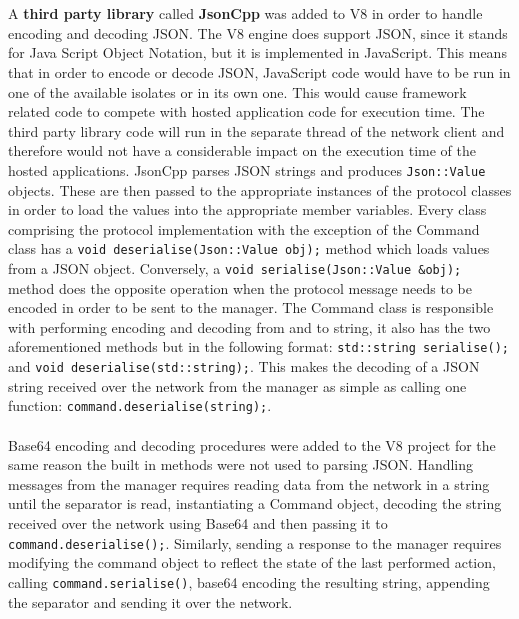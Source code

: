 \documentclass{l4proj}
\begin{document}
\\\\
\hspace*{1em} A \textbf{third party library} called \textbf{JsonCpp} was added to V8 in order to handle encoding and decoding JSON. The V8 engine does support JSON, since it stands for Java Script Object Notation, but it is implemented in JavaScript. This means that in order to encode or decode JSON, JavaScript code would have to be run in one of the available isolates or in its own one. This would cause framework related code to compete with hosted application code for execution time. The third party library code will run in the separate thread of the network client and therefore would not have a considerable impact on the execution time of the hosted applications. JsonCpp parses JSON strings and produces \texttt{Json::Value} objects. These are then passed to the appropriate instances of the protocol classes in order to load the values into the appropriate member variables. Every class comprising the protocol implementation with the exception of the Command class has a \texttt{void deserialise(Json::Value obj);} method which loads values from a JSON object. Conversely, a \texttt{void serialise(Json::Value \&obj);} method does the opposite operation when the protocol message needs to be encoded in order to be sent to the manager. The Command class is responsible with performing encoding and decoding from and to string, it also has the two aforementioned methods but in the following format: \texttt{std::string serialise();} and \texttt{void deserialise(std::string);}. This makes the decoding of a JSON string received over the network from the manager as simple as calling one function: \texttt{command.deserialise(string);}.
\\\\
\hspace*{1em} Base64 encoding and decoding procedures were added to the V8 project for the same reason the built in methods were not used to parsing JSON. Handling messages from the manager requires reading data from the network in a string until the separator is read, instantiating a Command object, decoding the string received over the network using Base64 and then passing it to \texttt{command.deserialise();}. Similarly, sending a response to the manager requires modifying the command object to reflect the state of the last performed action, calling \texttt{command.serialise()}, base64 encoding the resulting string, appending the separator and sending it over the network.
\end{document}
